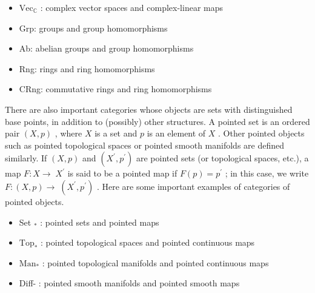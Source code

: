 \begin{example}[Categories]
\begin{itemize}
\item ${\mathrm{{Vec}}}_{\mathbb{C}}$ : complex vector spaces and complex-linear maps
\end{itemize}

\begin{itemize}
\item Grp: groups and group homomorphisms
\end{itemize}

\begin{itemize}
\item Ab: abelian groups and group homomorphisms
\end{itemize}

\begin{itemize}
\item Rng: rings and ring homomorphisms
\end{itemize}

\begin{itemize}
\item CRng: commutative rings and ring homomorphisms
\end{itemize}

There are also important categories whose objects are sets with distinguished base points, in addition to (possibly) other structures. A pointed set is an ordered pair $\left( {X, p}\right)$ , where $X$ is a set and $p$ is an element of $X$ . Other pointed objects such as pointed topological spaces or pointed smooth manifolds are defined similarly. If $\left( {X, p}\right)$ and $\left( {{X}^{\prime },{p}^{\prime }}\right)$ are pointed sets (or topological spaces, etc.), a map $F : X \rightarrow \; {X}^{\prime }$ is said to be a pointed map if $F\left( p\right)  = {p}^{\prime }$ ; in this case, we write $F : \left( {X, p}\right)  \rightarrow \; \left( {{X}^{\prime },{p}^{\prime }}\right)$ . Here are some important examples of categories of pointed objects.

\begin{itemize}
\item Set ${}_{ * }$ : pointed sets and pointed maps
\end{itemize}

\begin{itemize}
\item ${\mathrm{{Top}}}_{ * }$ : pointed topological spaces and pointed continuous maps
\end{itemize}

\begin{itemize}
\item ${\mathrm{{Man}}}_{ * }$ : pointed topological manifolds and pointed continuous maps
\end{itemize}

\begin{itemize}
\item Diff- : pointed smooth manifolds and pointed smooth maps
\end{itemize}
\end{example}

